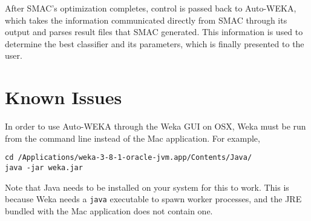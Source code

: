 \documentclass{article}
\begin{document}
After SMAC's optimization completes, control is passed back to Auto-WEKA, which
takes the information communicated directly from SMAC through its output and
parses result files that SMAC generated. This information is used to determine
the best classifier and its parameters, which is finally presented to the user.

\section{Known Issues}

In order to use Auto-WEKA through the Weka GUI on OSX, Weka must be run from the
command line instead of the Mac application. For example,

\begin{verbatim}
cd /Applications/weka-3-8-1-oracle-jvm.app/Contents/Java/
java -jar weka.jar
\end{verbatim}

Note that Java needs to be installed on your system for this to work. This is because
Weka needs a \verb=java= executable to spawn worker processes, and the JRE bundled
with the Mac application does not contain one.

\appendix


\end{document}
